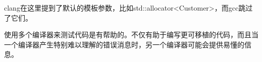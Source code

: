 clang在这里提到了默认的模板参数，比如std::allocator<Customer>，而gcc跳过了它们。

使用多个编译器来测试代码是有帮助的。不仅有助于编写更可移植的代码，而且当一个编译器产生特别难以理解的错误消息时，另一个编译器可能会提供易懂的信息。


























